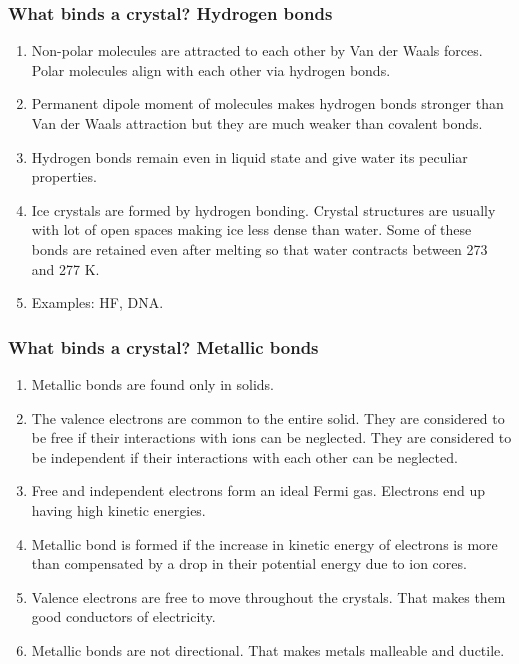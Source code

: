 \documentclass{beamer}
\begin{document}
\begin{frame}
\frametitle{What binds a crystal? Hydrogen bonds}
\begin{enumerate}
\item Non-polar molecules are attracted to each other by Van der Waals forces.
Polar molecules align with each other via hydrogen bonds.
\item Permanent dipole moment of molecules makes hydrogen bonds stronger than
Van der Waals attraction but they are much weaker than covalent bonds. 
\item Hydrogen bonds remain even in liquid state and give water its peculiar
properties.
\item Ice crystals are formed by hydrogen bonding. Crystal structures are 
usually with lot of open spaces making ice less dense than water. Some of these
bonds are retained even after melting so that water contracts between 273 and 
277 K.
\item Examples: HF, DNA.
\end{enumerate}
\end{frame}

\begin{frame}
\frametitle{What binds a crystal? Metallic bonds}
\begin{enumerate}
\item Metallic bonds are found only in solids.
\item The valence electrons are common to the entire solid. They are considered
to be free if their interactions with ions can be neglected. They are considered
to be independent if their interactions with each other can be neglected.
\item Free and independent electrons form an ideal Fermi gas. Electrons end up
having high kinetic energies.
\item Metallic bond is formed if the increase in kinetic energy of electrons is
more than compensated by a drop in their potential energy due to ion cores.
\item Valence electrons are free to move throughout the crystals. That makes 
them good conductors of electricity.
\item Metallic bonds are not directional. That makes metals malleable and 
ductile.
\end{enumerate}
\end{frame}
\end{document}
